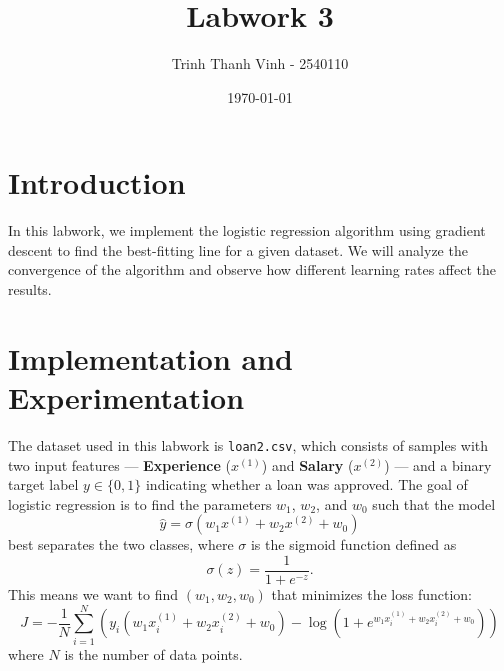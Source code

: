 \documentclass[12pt]{article}
\title{Labwork 3}
\author{Trinh Thanh Vinh - 2540110}
\date{\today}
\begin{document}
\maketitle

\section{Introduction}
In this labwork, we implement the logistic regression algorithm using gradient descent to find the best-fitting line for a given dataset. We will analyze the convergence of the algorithm and observe how different learning rates affect the results.
\section{Implementation and Experimentation}
The dataset used in this labwork is \texttt{loan2.csv}, which consists of samples with two input features --- \textbf{Experience} ($x^{(1)}$) and \textbf{Salary} ($x^{(2)}$) --- and a binary target label $y \in \{0, 1\}$ indicating whether a loan was approved. The goal of logistic regression is to find the parameters $w_1$, $w_2$, and $w_0$ such that the model
\[
\hat{y} = \sigma(w_1 x^{(1)} + w_2 x^{(2)} + w_0)
\]
best separates the two classes, where $\sigma$ is the sigmoid function defined as
\[
\sigma(z) = \frac{1}{1 + e^{-z}}.
\]
This means we want to find $(w_1, w_2, w_0)$ that minimizes the loss function:
\[
J = -\frac{1}{N} \sum_{i=1}^{N} \left( y_i(w_1 x_i^{(1)} + w_2 x_i^{(2)} + w_0) - \log\left(1 + e^{w_1 x_i^{(1)} + w_2 x_i^{(2)} + w_0}\right) \right)
\]
where $N$ is the number of data points.
\end{document}
